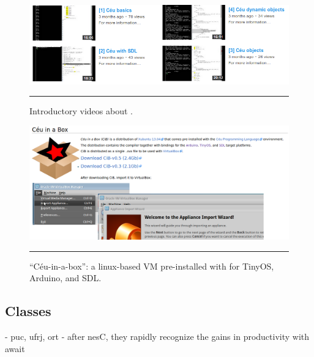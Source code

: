\begin{figure}[t]
\centering
\includegraphics[scale=0.48]{videos.png}
\rule{14cm}{0.37pt}
\caption{ Introductory videos about \CEU.
\label{fig.videos}
}
\end{figure}

\begin{figure}[t]
\centering
\includegraphics[scale=0.35]{cib.png}
\rule{14cm}{0.37pt}
\caption{ ``C\'eu-in-a-box'': a linux-based VM pre-installed with \CEU for 
TinyOS, Arduino, and SDL.
\label{fig.cib}
}
\end{figure}

\subsection{Classes}
    - puc, ufrj, ort
    - after nesC, they rapidly recognize the gains in productivity with await
